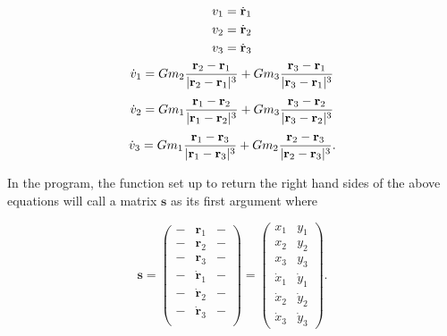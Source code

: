 \documentclass[11pt]{article}
\begin{document}
\begin{equation*}
v_1 = \dot{\mathbf{r}}_1\\
\end{equation*}
\begin{equation*}
v_2 = \dot{\mathbf{r}}_2\\
\end{equation*}
\begin{equation*}
v_3 = \dot{\mathbf{r}}_3\\
\end{equation*}
\begin{equation}
\dot{v}_1 = Gm_2\frac{\mathbf{r}_2 - \mathbf{r}_1}{|\mathbf{r}_2 - \mathbf{r}_1|^3} + Gm_3\frac{\mathbf{r}_3 - \mathbf{r}_1}{|\mathbf{r}_3 - \mathbf{r}_1|^3}\\
\end{equation}
\begin{equation*}
\dot{v}_2 = Gm_1\frac{\mathbf{r}_1 - \mathbf{r}_2}{|\mathbf{r}_1 - \mathbf{r}_2|^3} + Gm_3\frac{\mathbf{r}_3 - \mathbf{r}_2}{|\mathbf{r}_3 - \mathbf{r}_2|^3}\\
\end{equation*}
\begin{equation*}
\dot{v}_3 = Gm_1\frac{\mathbf{r}_1 - \mathbf{r}_3}{|\mathbf{r}_1 - \mathbf{r}_3|^3} + Gm_2\frac{\mathbf{r}_2 - \mathbf{r}_3}{|\mathbf{r}_2 - \mathbf{r}_3|^3}.\\
\end{equation*}

In the program, the function set up to return the right hand sides of
the above equations will call a matrix \(\mathbf{s}\) as its first
argument where

\[\mathbf{s} = \begin{pmatrix}
- & \mathbf{r}_1 & -\\
- & \mathbf{r}_2 & -\\
- & \mathbf{r}_3 & -\\
- & \dot{\mathbf{r}}_1 & -\\
- & \dot{\mathbf{r}}_2 & -\\
- & \dot{\mathbf{r}}_3 & -\\
\end{pmatrix} = \begin{pmatrix}
x_1 & y_1\\
x_2 & y_2\\
x_3 & y_3\\
\dot{x}_1 & \dot{y}_1\\
\dot{x}_2 & \dot{y}_2\\
\dot{x}_3 & \dot{y}_3
\end{pmatrix}.\]
\end{document}
